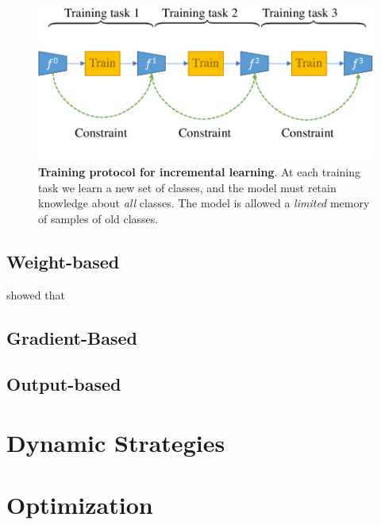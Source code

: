 \begin{figure}[tb]
    \begin{center}
        \includegraphics[width=0.8\linewidth]{images/related/continual_regularizations.pdf}
    \end{center}
    \caption{\textbf{Training protocol for incremental learning}. At each training task we learn a
        new set of classes, and the model must retain knowledge about \textit{all} classes. The
        model is allowed a \textit{limited} memory of samples of old classes.}
    \label{fig:related_regul}
\end{figure}

\subsection{Weight-based}

\citep{lesort2019regulshortcomings} showed that


\subsection{Gradient-Based}

\subsection{Output-based}

\section{Dynamic Strategies}



\section{Optimization}

